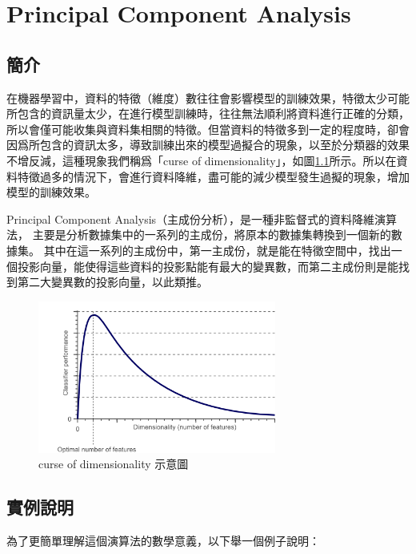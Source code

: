 \chapter{Principal Component Analysis}
\label{chapter:pca}
\section{簡介}
\label{sec:background}


在機器學習中，資料的特徵（維度）數往往會影響模型的訓練效果，特徵太少可能所包含的資訊量太少，在進行模型訓練時，往往無法順利將資料進行正確的分類，所以會僅可能收集與資料集相關的特徵。但當資料的特徵多到一定的程度時，卻會因爲所包含的資訊太多，導致訓練出來的模型過擬合的現象，以至於分類器的效果不增反減，這種現象我們稱爲「curse of dimensionality」，如圖\ref{fig:curse_of_dimesionality}所示。所以在資料特徵過多的情況下，會進行資料降維，盡可能的減少模型發生過擬的現象，增加模型的訓練效果。

Principal Component Analysis（主成份分析），是一種非監督式的資料降維演算法，
主要是分析數據集中的一系列的主成份，將原本的數據集轉換到一個新的數據集。
其中在這一系列的主成份中，第一主成份，就是能在特徵空間中，找出一個投影向量，能使得這些資料的投影點能有最大的變異數，而第二主成份則是能找到第二大變異數的投影向量，以此類推。




\begin{figure}[h]
	\centering
	\includegraphics[height=5cm]{./pic/NZgacRXF.png}
	\caption{curse of dimensionality 示意圖}
	\label{fig:curse_of_dimesionality}
\end{figure}

\section{實例說明}
為了更簡單理解這個演算法的數學意義，以下舉一個例子說明：



